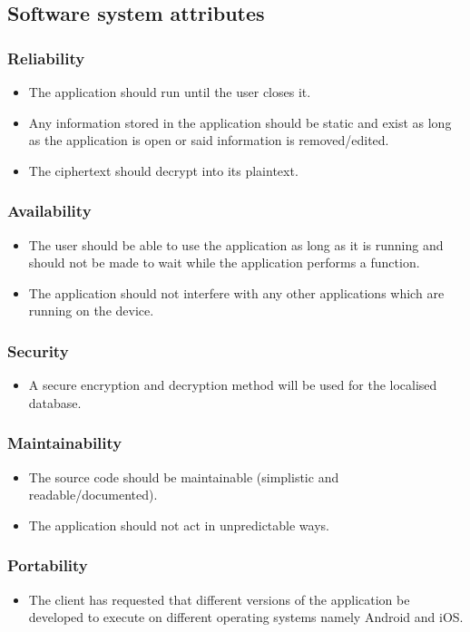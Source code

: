 \subsection{Software system attributes}
\subsubsection{Reliability}
\begin{itemize}
\item The application should run until the user closes it.
\item Any information stored in the application should be static and exist as long as the application is open or said information is removed/edited.
\item The ciphertext should decrypt into its plaintext.
\end{itemize}
\subsubsection{Availability}
\begin{itemize}
\item The user should be able to use the application as long as it is running and should not be made to wait while the application performs a function.
\item The application should not interfere with any other applications which are running on the device.
\end{itemize}
\subsubsection{Security}
\begin{itemize}
\item A secure encryption and decryption method will be used for the localised database.
\end{itemize}
\subsubsection{Maintainability}
\begin{itemize}
\item The source code should be maintainable (simplistic and readable/documented).
\item The application should not act in unpredictable ways.
\end{itemize}
\subsubsection{Portability}
\begin{itemize}
\item The client has requested that different versions of the application be developed to execute on different operating systems namely Android and iOS.
\end{itemize}